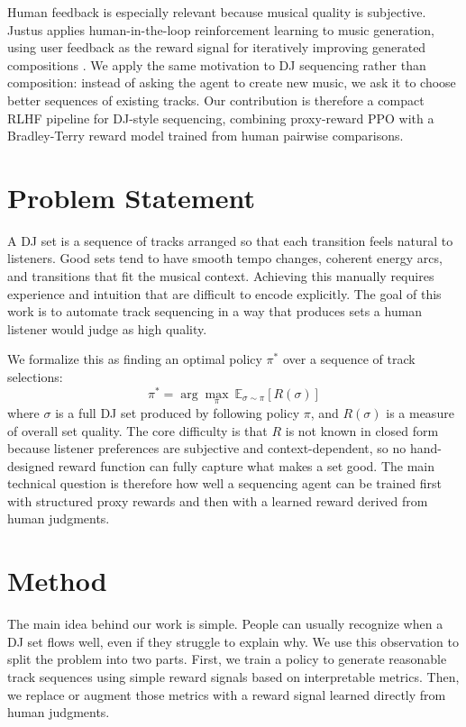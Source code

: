 \documentclass{article}
\begin{document}
Human feedback is especially relevant because musical quality is subjective. Justus applies human-in-the-loop reinforcement learning to music generation, using user feedback as the reward signal for iteratively improving generated compositions \cite{hitl_music}. We apply the same motivation to DJ sequencing rather than composition: instead of asking the agent to create new music, we ask it to choose better sequences of existing tracks. Our contribution is therefore a compact RLHF pipeline for DJ-style sequencing, combining proxy-reward PPO with a Bradley-Terry reward model trained from human pairwise comparisons.

\section{Problem Statement}

A DJ set is a sequence of tracks arranged so that each transition feels natural to listeners. Good sets tend to have smooth tempo changes, coherent energy arcs, and transitions that fit the musical context. Achieving this manually requires experience and intuition that are difficult to encode explicitly. The goal of this work is to automate track sequencing in a way that produces sets a human listener would judge as high quality.

We formalize this as finding an optimal policy $\pi^*$ over a sequence of track selections:
\begin{equation}
    \pi^* = \arg\max_{\pi}\ \mathbb{E}_{\sigma \sim \pi}\left[R(\sigma)\right]
\end{equation}
where $\sigma$ is a full DJ set produced by following policy $\pi$, and $R(\sigma)$ is a measure of overall set quality. The core difficulty is that $R$ is not known in closed form because listener preferences are subjective and context-dependent, so no hand-designed reward function can fully capture what makes a set good. The main technical question is therefore how well a sequencing agent can be trained first with structured proxy rewards and then with a learned reward derived from human judgments.

\section{Method}

The main idea behind our work is simple. People can usually recognize when a DJ set flows well, even if they struggle to explain why. We use this observation to split the problem into two parts. First, we train a policy to generate reasonable track sequences using simple reward signals based on interpretable metrics. Then, we replace or augment those metrics with a reward signal learned directly from human judgments.
\end{document}
